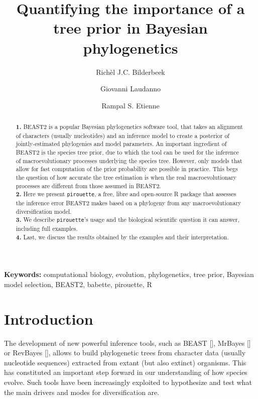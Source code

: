 \documentclass{article}
\title{
  Quantifying the importance of a tree prior in Bayesian phylogenetics
}
\author[1]{Rich\`el J.C. Bilderbeek}
\author[1]{Giovanni Laudanno}
\author[1]{Rampal S. Etienne}
\affil[1]{Groningen Institute for Evolutionary Life Sciences, University of 
Groningen, Groningen, The Netherlands}
\begin{document}
\maketitle

\begin{abstract}

  \textbf{1. }
    BEAST2 is a popular Bayesian phylogenetics software tool,
    that takes an alignment of characters (usually nucleotides) 
    and an inference model to create a
    posterior of jointly-estimated phylogenies and model parameters. 
    An important ingredient of BEAST2 is the species tree prior, 
    due to which the tool can be used for the inference of 
    macroevolutionary processes underlying the species tree. 
    However, only models that allow for fast computation of 
    the prior probability are possible in practice. 
    This begs the question of how accurate the tree estimation is 
    when the real macroevolutionary processes are different 
    from those assumed in BEAST2. \\
  \textbf{2. }
    Here we present \verb;pirouette;, 
    a free, libre and open-source R package that assesses 
    the inference error BEAST2 makes based on a 
    phylogeny from any macroevolutionary diversification model. \\
  \textbf{3. }
    We describe \verb;pirouette;'s usage and the biological scientific
    question it can answer, including full examples. \\
  \textbf{4. }
    Last, we discuss the results obtained by the examples and their interpretation. \\
\end{abstract}

{\bf Keywords:} computational biology, evolution, phylogenetics, tree prior,
  Bayesian model selection, BEAST2, babette, pirouette, R

\section{Introduction}

The development of new powerful inference tools, 
such as BEAST [\cite{drummond2007beast}], 
MrBayes [\cite{huelsenbeck2001mrbayes}]
or RevBayes [\cite{hohna2016revbayes}], 
allows to build phylogenetic trees 
from character data (usually nucleotide sequences) extracted 
from extant (but also extinct) organisms.
This has constituted an important step forward 
in our understanding of how species evolve.
Such tools have been increasingly exploited to hypothesize 
and test what the main drivers and modes for diversification are.
\end{document}
